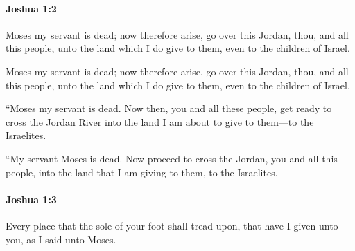		\paragraph{Joshua 1:2} %
			\label{JOSHUA-1-2}

			Moses my servant is dead; now therefore arise, go over this Jordan, thou, and all this people, unto the land which I do give to them, even to the children of Israel.

			\begin{versebox}
					\item[BHS] 
					\item[ASV] Moses my servant is dead; now therefore arise, go over this Jordan, thou, and all this people, unto the land which I do give to them, even to the children of Israel.
					\item[NIV] “Moses my servant is dead. Now then, you and all these people, get ready to cross the Jordan River into the land I am about to give to them—to the Israelites.
					\item[NRSV] “My servant Moses is dead. Now proceed to cross the Jordan, you and all this people, into the land that I am giving to them, to the Israelites.
			\end{versebox}

		\paragraph{Joshua 1:3} %
			\label{JOSHUA-1-3}

			Every place that the sole of your foot shall tread upon, that have I given unto you, as I said unto Moses.

